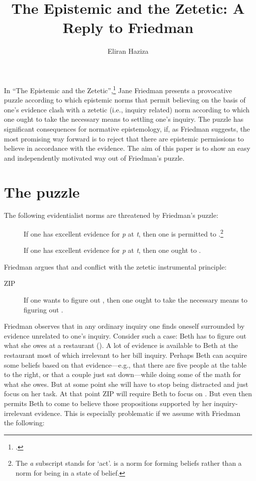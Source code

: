 \documentclass[12pt]{article}
\title{The Epistemic and the Zetetic: A Reply to Friedman}
\author{Eliran Haziza}
\begin{document}
\maketitle

\noindent In ``The Epistemic and the Zetetic'',\footnote{\textcite{friedman_epistemic_nodate}.} Jane Friedman presents a provocative puzzle according to which epistemic norms that permit believing on the basis of one's evidence clash with a zetetic (i.e., inquiry related) norm according to which one ought to take the necessary means to settling one's inquiry. The puzzle has significant consequences for normative epistemology, if, as Friedman suggests, the most promising way forward is to reject that there are epistemic permissions to believe in accordance with the evidence. The aim of this paper is to show an easy and independently motivated way out of Friedman's puzzle.

\section{The puzzle}\label{sec:puzz}

The following evidentialist norms are threatened by Friedman's puzzle:

\begin{description}
    \item[\ep] If one has excellent evidence for \textit{p} at \textit{t}, then one is permitted to \jud{}.\footnote{The \textit{a} subscript stands for `act'. \ep{} is a norm for forming beliefs rather than a norm for being in a state of belief.}
    \item[\eo] If one has excellent evidence for \textit{p} at \textit{t}, then one ought to \jud{}.
\end{description}
%
Friedman argues that \ep{} and \eo{} conflict with the zetetic instrumental principle:

\begin{description}
    \item[ZIP] If one wants to figure out , then one ought to take the necessary means to figuring out .
\end{description}
%
Friedman observes that in any ordinary inquiry one finds oneself surrounded by evidence unrelated to one's inquiry. Consider such a case: Beth has to figure out what she owes at a restaurant (). A lot of evidence is available to Beth at the restaurant most of which irrelevant to her bill inquiry. Perhaps Beth can acquire some beliefs based on that evidence---e.g., that there are five people at the table to the right, or that a couple just sat down---while doing some of the math for what she owes. But at some point she will have to stop being distracted and just focus on her task. At that point ZIP will require Beth to focus on . But even then \ep{} permits Beth to come to believe those propositions supported by her inquiry-irrelevant evidence. This is especially problematic if we assume with Friedman the following:
\end{document}
